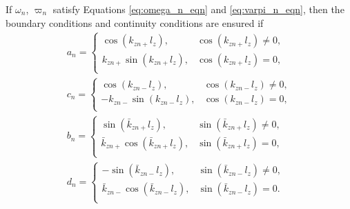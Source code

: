 If $\omega_n$, $\varpi_n$ satisfy Equations \eqref{eq:omega_n_eqn} and \eqref{eq:varpi_n_eqn}, then the boundary conditions and continuity conditions are ensured if
\begin{gather}
a_n = \begin{cases}
\cos(k_{zn+} l_z), & \cos(k_{zn+} l_z) \ne 0, \\
k_{zn+}\sin(k_{zn+} l_z), & \cos(k_{zn+} l_z) = 0, \\
\end{cases} \\
c_n = \begin{cases}
\cos(k_{zn-} l_z), & \cos(k_{zn-} l_z) \ne 0, \\
-k_{zn-}\sin(k_{zn-} l_z), & \cos(k_{zn-} l_z) = 0, \\
\end{cases} \\
b_n = \begin{cases}
\sin(\bar{k}_{zn+} l_z), & \sin(\bar{k}_{zn+} l_z) \ne 0, \\
\bar{k}_{zn+}\cos(\bar{k}_{zn+} l_z), & \sin(\bar{k}_{zn+} l_z) = 0, \\
\end{cases} \\
d_n = \begin{cases}
-\sin(\bar{k}_{zn-} l_z), & \sin(\bar{k}_{zn-} l_z) \ne 0, \\
\bar{k}_{zn-}\cos(\bar{k}_{zn-} l_z), & \sin(\bar{k}_{zn-} l_z) = 0. \\
\end{cases}
\end{gather}

